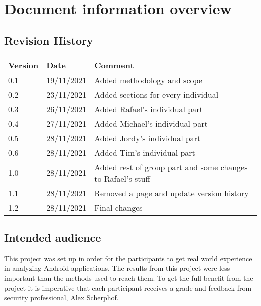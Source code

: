 \section*{Document information overview}
\subsection*{Revision History}

\begin{tabularx}{\textwidth}{|l|l|X|}
  \hline
  \textbf{Version} & \textbf{Date} & \textbf{Comment}                  \\ \hline
  0.1              & 19/11/2021    & Added methodology and scope       \\ \hline
  0.2              & 23/11/2021    & Added sections for every individual \\ \hline
  0.3              & 26/11/2021    & Added Rafael's individual part      \\ \hline
  0.4              & 27/11/2021    & Added Michael's individual part      \\ \hline
  0.5              & 28/11/2021    & Added Jordy's individual part      \\ \hline
  0.6              & 28/11/2021    & Added Tim's individual part      \\ \hline
  1.0              & 28/11/2021    & Added rest of group part and some changes to Rafael's stuff      \\ \hline
  1.1              & 28/11/2021    & Removed a page and update version history     \\ \hline
  1.2              & 28/11/2021    & Final changes     \\ \hline
\end{tabularx}

\subsection*{Intended audience}

This project was set up in order for the participants to get real world experience in analyzing Android applications.
The results from this project were less important than the methods used to reach them.
To get the full benefit from the project it is imperative that each participant receives a grade and feedback from security professional, Alex Scherphof.

\newpage
